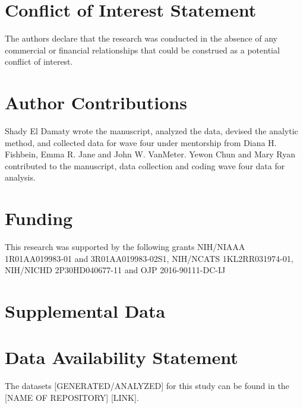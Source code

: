 \documentclass[utf8]{article}
\begin{document}

\section*{Conflict of Interest Statement}
The authors declare that the research was conducted in the absence of any commercial or financial relationships that could be construed as a potential conflict of interest.

\section*{Author Contributions}
Shady El Damaty wrote the manuscript, analyzed the data, devised the analytic method, and collected data for wave four under mentorship from Diana H. Fishbein, Emma R. Jane and John W. VanMeter. Yewon Chun and Mary Ryan contributed to the manuscript, data collection and coding wave four data for analysis. 

\section*{Funding}
This research was supported by the following grants NIH/NIAAA 1R01AA019983-01 and 3R01AA019983-02S1, NIH/NCATS 1KL2RR031974-01, 
NIH/NICHD 2P30HD040677-11 and OJP 2016-90111-DC-IJ

\section*{Supplemental Data}

\section*{Data Availability Statement}
The datasets [GENERATED/ANALYZED] for this study can be found in the [NAME OF REPOSITORY] [LINK].
\clearpage
\end{document}
